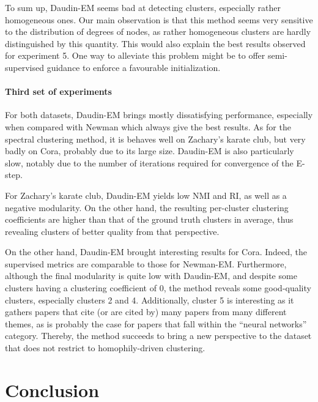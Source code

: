 \documentclass[switch, 12pt]{article}
\begin{document}
\begin{multicols}{2}
    To sum up, Daudin-EM seems bad at detecting clusters, especially rather homogeneous ones. Our main observation is that this method seems very sensitive to the distribution of degrees of nodes, as rather homogeneous clusters are hardly distinguished by this quantity. This would also explain the best results observed for experiment 5. One way to alleviate this problem might be to offer semi-supervised guidance to enforce a favourable initialization.

    \paragraph{Third set of experiments} For both datasets, Daudin-EM brings mostly dissatisfying performance, especially when compared with Newman which always give the best results. As for the spectral clustering method, it is behaves well on Zachary's karate club, but very badly on Cora, probably due to its large size. Daudin-EM is also particularly slow, notably due to the number of iterations required for convergence of the E-step.

    For Zachary's karate club, Daudin-EM yields low NMI and RI, as well as a negative modularity. On the other hand, the resulting per-cluster clustering coefficients are higher than that of the ground truth clusters in average, thus revealing clusters of better quality from that perspective.

    On the other hand, Daudin-EM brought interesting results for Cora. Indeed, the supervised metrics are comparable to those for Newman-EM. Furthermore, although the final modularity is quite low with Daudin-EM, and despite some clusters having a clustering coefficient of 0, the method reveals some good-quality clusters, especially clusters 2 and 4. Additionally, cluster 5 is interesting as it gathers papers that cite (or are cited by) many papers from many different themes, as is probably the case for papers that fall within the ``neural networks'' category. Thereby, the method succeeds to bring a new perspective to the dataset that does not restrict to homophily-driven clustering.


    \section{Conclusion}
    \label{sec:conclusion}


\end{multicols}
\end{document}
